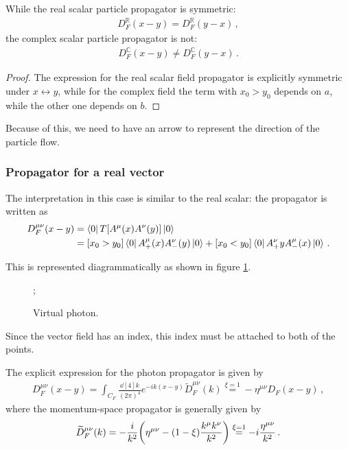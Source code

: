 \documentclass[main.tex]{subfiles}
\begin{document}
\begin{claim}
While the real scalar particle propagator is symmetric: 
%
\begin{align}
D_F^{\mathbb{R}} (x-y)  =D_F^{\mathbb{R}} (y-x)
\,,
\end{align}
%
the complex scalar particle propagator is not: 
%
\begin{align}
D_F^{\mathbb{C}} (x-y) \neq D_F^{\mathbb{C}} (y-x)
\,.
\end{align}
\end{claim}

\begin{proof}
The expression for the real scalar field propagator is explicitly symmetric under \(x \leftrightarrow y\), while for the complex field the term with \(x_0 > y_0 \) depends on \(a\), while the other one depends on \(b\).  
\end{proof}

Because of this, we need to have an arrow to represent the direction of the particle flow. 

\subsubsection{Propagator for a real vector}

The interpretation in this case is similar to the real scalar: the propagator is written as 
%
\begin{align}
D^{\mu \nu }_{F} (x-y) &= \bra{0} T[A^{\mu }(x) A^{\nu }(y)] \ket{0}  \\
&= [x_0 > y_0 ] \bra{0} A^{\mu }_{+}(x) A^{\nu }_{-}(y) \ket{0}
+ [x_0 < y_0 ] \bra{0} A^{\nu }_{+} y A^{\mu }_{-}(x) \ket{0} 
\,.
\end{align}

This is represented diagrammatically as shown in figure \ref{fig:virtual-photon-diagram}.

\begin{figure}[ht]
\centering
{};
\caption{Virtual photon.}
\label{fig:virtual-photon-diagram}
\end{figure}

Since the vector field has an index, this index must be attached to both of the points. 

The explicit expression for the photon propagator is given by 
%
\begin{align}
D^{\mu \nu }_{F} (x-y) = \int_{C_F} \frac{ \dd[4]{k}}{(2 \pi )^{4}}
e^{-ik(x-y)} \widetilde{D}^{\mu \nu }_{F} (k) \overset{\xi = 1}{=} - \eta^{\mu \nu } D_F (x-y)
\,,
\end{align}
%
where the momentum-space propagator is generally given by
%
\begin{align}
\widetilde{D}^{\mu \nu }_{F} (k) = - \frac{i}{k^2} \qty(\eta^{ \mu \nu } - (1 - \xi ) \frac{k^{\mu }k^{\nu }}{k^2}) 
\overset{\xi = 1}{=}
- i \frac{\eta^{\mu \nu }}{k^2}
\,.
\end{align}
\end{document}
